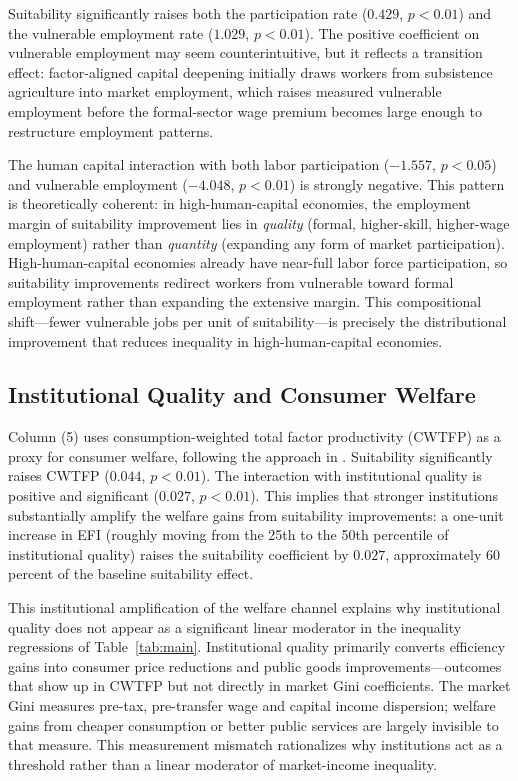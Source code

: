 \documentclass[12pt]{article}
\begin{document}
Suitability significantly raises both the participation rate
($0.429$, $p < 0.01$) and the vulnerable employment rate
($1.029$, $p < 0.01$).
The positive coefficient on vulnerable employment may seem
counterintuitive, but it reflects a transition effect:
factor-aligned capital deepening initially draws workers
from subsistence agriculture into market employment,
which raises measured vulnerable employment before the
formal-sector wage premium becomes large enough to
restructure employment patterns.

The human capital interaction with both labor participation
($-1.557$, $p < 0.05$) and vulnerable employment
($-4.048$, $p < 0.01$) is strongly negative.
This pattern is theoretically coherent:
in high-human-capital economies, the employment margin of
suitability improvement lies in \emph{quality}
(formal, higher-skill, higher-wage employment)
rather than \emph{quantity} (expanding any form of market participation).
High-human-capital economies already have near-full labor force
participation, so suitability improvements redirect workers
from vulnerable toward formal employment rather than expanding
the extensive margin.
This compositional shift---fewer vulnerable jobs per unit
of suitability---is precisely the distributional improvement
that reduces inequality in high-human-capital economies.

\subsection{Institutional Quality and Consumer Welfare}

Column (5) uses consumption-weighted total factor productivity
(CWTFP) as a proxy for consumer welfare, following the
approach in \citet{feenstra2015next}.
Suitability significantly raises CWTFP ($0.044$, $p < 0.01$).
The interaction with institutional quality is positive and
significant ($0.027$, $p < 0.01$).
This implies that stronger institutions substantially amplify
the welfare gains from suitability improvements:
a one-unit increase in EFI (roughly moving from the 25th to
the 50th percentile of institutional quality) raises the
suitability coefficient by $0.027$, approximately
60 percent of the baseline suitability effect.

This institutional amplification of the welfare channel
explains why institutional quality does not appear as a
significant linear moderator in the inequality regressions
of Table~\ref{tab:main}.
Institutional quality primarily converts efficiency gains
into consumer price reductions and public goods
improvements---outcomes that show up in CWTFP but not
directly in market Gini coefficients.
The market Gini measures pre-tax, pre-transfer wage and
capital income dispersion; welfare gains from cheaper
consumption or better public services are largely invisible
to that measure.
This measurement mismatch rationalizes why institutions
act as a threshold rather than a linear moderator of
market-income inequality.
\end{document}
